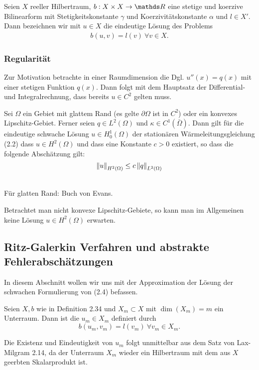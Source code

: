 Seien $X$ reeller Hilbertraum, $b:X\times X\to \R$ eine stetige und koerzive Bilinearform mit Stetigkeitskonstante $\gamma$ und Koerzivitätskonstante $\alpha$ und $l\in X'$.
Dann bezeichnen wir mit $u\in X$ die eindeutige Lösung des Problems
\begin{align}
b(u,v) = l(v) ~\forall v\in X.
\end{align}

\subsubsection{Regularität}
Zur Motivation betrachte in einer Raumdimension die Dgl. $u''(x) = q(x)$ mit einer stetigen Funktion $q(x)$.
Dann folgt mit dem Hauptsatz der Differential- und Integralrechnung, dass bereits $u\in C^2$ gelten muss.

Sei $\Omega$ ein Gebiet mit glattem Rand (es gelte $\partial\Omega$ ist in $C^2$) oder ein konvexes Lipschitz-Gebiet.
Ferner seien $q\in L^2(\Omega)$ und $\kappa\in C^1(\bar{\Omega})$.
Dann gilt für die eindeutige schwache Lösung $u\in H_0^1(\Omega)$ der stationären Wärmeleitungsgleichung (2.2) dass $u\in H^2(\Omega)$ und dass eine Konstante $c>0$ existiert, so dass die folgende Abschätzung gilt:
\[
\left\Vert u\right\Vert_{H^2(\Omega)} \le c\left\Vert q\right\Vert_{L^2(\Omega)}
\]

\\
Für glatten Rand: Buch von Evans.

Betrachtet man nicht konvexe Lipschitz-Gebiete, so kann man im Allgemeinen keine Lösung $u\in H^2(\Omega)$ erwarten.

\subsection{Ritz-Galerkin Verfahren und abstrakte Fehlerabschätzungen}
In diesem Abschnitt wollen wir uns mit der Approximation der Lösung der schwachen Formulierung von (2.4) befassen.

Seien $X,b$ wie in Definition 2.34 und $X_m\subset X$ mit $\dim (X_m) = m$ ein Unterraum.
Dann ist die  $u_m\in X_m$ definiert durch
\[
b(u_m,v_m)=l(v_m)~\forall v_m\in X_m.
\]

Die Existenz und Eindeutigkeit von $u_m$ folgt unmittelbar aus dem Satz von Lax-Milgram 2.14, da der Unterraum $X_m$ wieder ein Hilbertraum mit dem aus $X$ geerbten Skalarprodukt ist.

